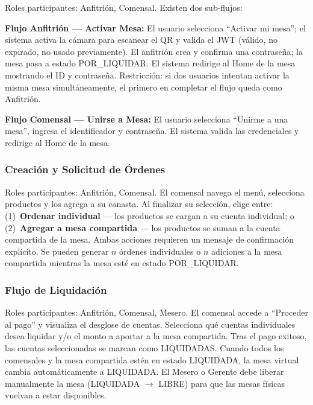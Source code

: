 Roles participantes: Anfitrión, Comensal. Existen dos sub-flujos:

\noindent\textbf{Flujo Anfitrión — Activar Mesa:} El usuario selecciona
``Activar mi mesa''; el sistema activa la cámara para escanear el QR y valida
el JWT (válido, no expirado, no usado previamente). El anfitrión crea y confirma
una contraseña; la mesa pasa a estado POR\_LIQUIDAR. El sistema redirige al Home
de la mesa mostrando el ID y contraseña. Restricción: si dos usuarios intentan
activar la misma mesa simultáneamente, el primero en completar el flujo queda
como Anfitrión.

\noindent\textbf{Flujo Comensal — Unirse a Mesa:} El usuario selecciona
``Unirme a una mesa'', ingresa el identificador y contraseña. El sistema valida
las credenciales y redirige al Home de la mesa.

\subsubsection{Creación y Solicitud de Órdenes}

Roles participantes: Anfitrión, Comensal. El comensal navega el menú, selecciona
productos y los agrega a su canasta. Al finalizar su selección, elige entre:
(1)~\textbf{Ordenar individual} — los productos se cargan a su cuenta individual;
o (2)~\textbf{Agregar a mesa compartida} — los productos se suman a la cuenta
compartida de la mesa. Ambas acciones requieren un mensaje de confirmación explícito.
Se pueden generar $n$ órdenes individuales o $n$ adiciones a la mesa compartida
mientras la mesa esté en estado POR\_LIQUIDAR.

\subsubsection{Flujo de Liquidación}

Roles participantes: Anfitrión, Comensal, Mesero. El comensal accede a
``Proceder al pago'' y visualiza el desglose de cuentas. Selecciona qué cuentas
individuales desea liquidar y/o el monto a aportar a la mesa compartida. Tras el
pago exitoso, las cuentas seleccionadas se marcan como LIQUIDADAS. Cuando todos
los comensales y la mesa compartida estén en estado LIQUIDADA, la mesa virtual
cambia automáticamente a LIQUIDADA. El Mesero o Gerente debe liberar manualmente
la mesa (LIQUIDADA $\rightarrow$ LIBRE) para que las mesas físicas vuelvan a estar
disponibles.

